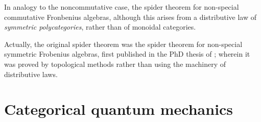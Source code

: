 In analogy to the noncommutative case, the spider theorem for non-special commutative Fronbenius algebras, although this arises from a distributive law of {\em symmetric polycategories}, rather than of monoidal categories.


Actually, the original spider theorem was the spider theorem for non-special symmetric Frobenius algebras, first published in the PhD thesis of \cite{spider}; wherein it was proved by topological methods rather than using the machinery of distributive laws.





\section{Categorical quantum mechanics}
\label{sec:cqm}
%
%
%
%
%
%
%
%
%
%
%

